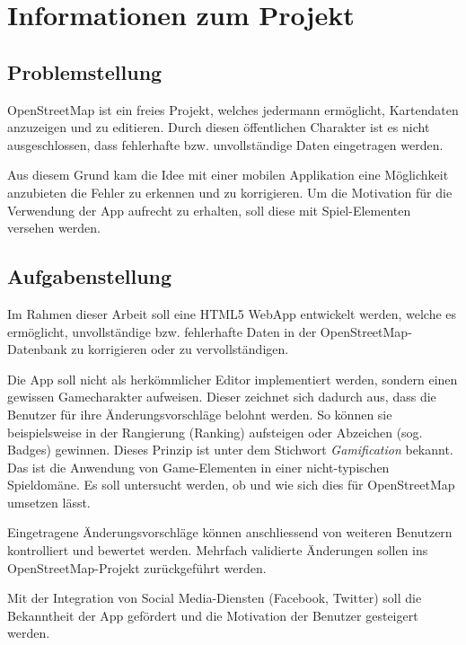 \chapter{Informationen zum Projekt}
\label{informationen-projekt}


\section{Problemstellung}
OpenStreetMap ist ein freies Projekt, welches jedermann ermöglicht, Kartendaten anzuzeigen und zu editieren.
Durch diesen öffentlichen Charakter ist es nicht ausgeschlossen, dass fehlerhafte bzw. unvollständige Daten eingetragen werden.

Aus diesem Grund kam die Idee mit einer mobilen Applikation eine Möglichkeit anzubieten die Fehler zu erkennen und zu korrigieren.
Um die Motivation für die Verwendung der App aufrecht zu erhalten, soll diese mit Spiel-Elementen versehen werden.

\section{Aufgabenstellung}
Im Rahmen dieser Arbeit soll eine HTML5 \gls{WebApp} entwickelt werden, welche es ermöglicht, unvollständige bzw. fehlerhafte Daten in der OpenStreetMap-Datenbank zu korrigieren oder zu vervollständigen.

Die App soll nicht als herkömmlicher Editor implementiert werden, sondern einen gewissen Gamecharakter aufweisen.
Dieser zeichnet sich dadurch aus, dass die Benutzer für ihre Änderungsvorschläge belohnt werden.
So können sie beispielsweise in der Rangierung (Ranking) aufsteigen oder Abzeichen (sog. Badges) gewinnen.
Dieses Prinzip ist unter dem Stichwort \emph{Gamification} bekannt.
Das ist die Anwendung von Game-Elementen in einer nicht-typischen Spieldomäne.
Es soll untersucht werden, ob und wie sich dies für OpenStreetMap umsetzen lässt.

Eingetragene Änderungsvorschläge können anschliessend von weiteren Benutzern kontrolliert und bewertet werden.
Mehrfach validierte Änderungen sollen ins OpenStreetMap-Projekt zurückgeführt werden.

Mit der Integration von Social Media-Diensten (Facebook, Twitter) soll die Bekanntheit der App gefördert und die Motivation der Benutzer gesteigert werden.

